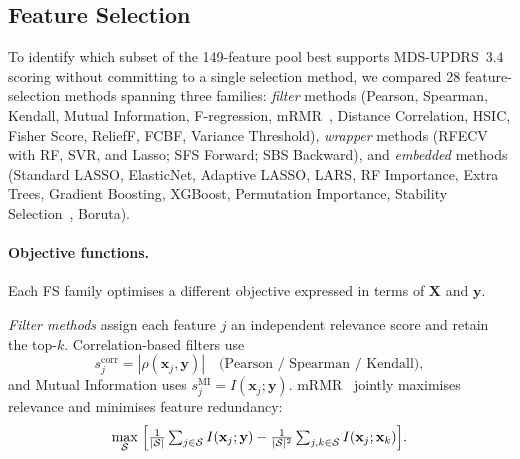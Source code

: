 \documentclass[12pt, a4paper]{article}
\begin{document}
\subsection{Feature Selection}\label{sec:fs}

To identify which subset of the 149-feature pool best supports MDS-UPDRS~3.4 scoring
without committing to a single selection method, we compared 28 feature-selection
methods spanning three families: \emph{filter} methods (Pearson, Spearman, Kendall,
Mutual Information, F-regression, mRMR~\cite{Peng2005}, Distance Correlation, HSIC,
Fisher Score, ReliefF, FCBF, Variance Threshold), \emph{wrapper}
methods (RFECV with RF, SVR, and Lasso; SFS Forward; SBS Backward), and
\emph{embedded} methods (Standard LASSO, ElasticNet, Adaptive LASSO, LARS,
RF Importance, Extra Trees, Gradient Boosting, XGBoost,
Permutation Importance, Stability Selection~\cite{Meinshausen2009}, Boruta).

\paragraph{Objective functions.}
Each FS family optimises a different objective expressed in terms of $\mathbf{X}$ and
$\mathbf{y}$.

\emph{Filter methods} assign each feature $j$ an independent relevance score and
retain the top-$k$.
Correlation-based filters use
\begin{equation}
    s_j^{\mathrm{corr}} = |\rho(\mathbf{x}_j,\mathbf{y})|
    \quad\text{(Pearson / Spearman / Kendall)},
    \label{eq:filter_corr}
\end{equation}
and Mutual Information uses $s_j^{\mathrm{MI}} = I(\mathbf{x}_j;\mathbf{y})$.
mRMR~\cite{Peng2005} jointly maximises relevance and minimises feature redundancy:
\begin{equation}
    \max_{\mathcal{S}}\;\Bigl[
        \tfrac{1}{|\mathcal{S}|}\textstyle\sum_{j\in\mathcal{S}} I(\mathbf{x}_j;\mathbf{y})
        -
        \tfrac{1}{|\mathcal{S}|^2}\textstyle\sum_{j,k\in\mathcal{S}} I(\mathbf{x}_j;\mathbf{x}_k)
    \Bigr].
    \label{eq:mrmr}
\end{equation}
\end{document}
